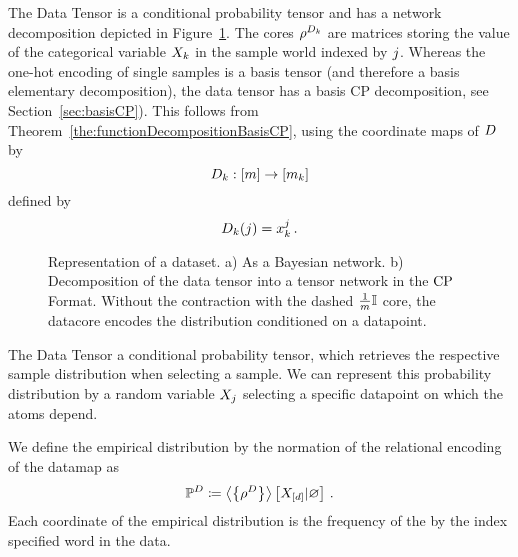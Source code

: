 The Data Tensor is a conditional probability tensor and has a network decomposition depicted in Figure~\ref{fig:DataDecomposition}.
The cores $\rho^{D_{k}}$ are matrices storing the value of the categorical variable $X_{k}$ in the sample world indexed by $j$.
Whereas the one-hot encoding of single samples is a basis tensor (and therefore a basis elementary decomposition), the data tensor has a basis CP decomposition, see Section~\ref{sec:basisCP}).
This follows from Theorem~\ref{the:functionDecompositionBasisCP}, using the coordinate maps of $D$ by
	\[ D_{k} : [m] \rightarrow [m_{k}] \]
defined by
	\[  D_{k}(j) = x_{k}^j \, .  \]

\begin{figure}[h]
\begin{center}
	
\end{center}
\caption{
	Representation of a dataset.
	a) As a Bayesian network.
	b) Decomposition of the data tensor into a tensor network in the $\mathrm{CP}$ Format.
	Without the contraction with the dashed $\frac{1}{m}\mathbb{I}$ core, the datacore encodes the distribution conditioned on a datapoint. }
\label{fig:DataDecomposition}
\end{figure}


The Data Tensor a conditional probability tensor, which retrieves the respective sample distribution when selecting a sample.
We can represent this probability distribution by a random variable $X_{j}$ selecting a specific datapoint on which the atoms depend.

We define the empirical distribution by the normation of the relational encoding of the datamap as
\begin{align*}
	\mathbb{P}^{D} 
	\coloneqq \left\langle \left\{\rho^{D}\right\}\right\rangle \left[ X_{[d]} | \varnothing \right] \, . 
\end{align*}
Each coordinate of the empirical distribution is the frequency of the by the index specified word in the data.

